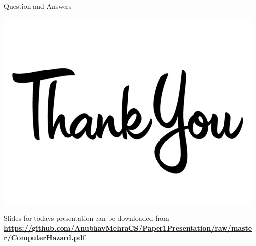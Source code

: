 \documentclass{beamer}
\begin{document}
\begin{frame}{Question and Answers}
	\begin{center}
		\includegraphics[scale=0.2]{thank.jpg}
	\end{center}
	\large Slides for todays presentation can be downloaded from 
	\tiny \textbf{\underline{https://github.com/AnubhavMehraCS/Paper1Presentation/raw/master/ComputerHazard.pdf}}
\end{frame}
\end{document}
